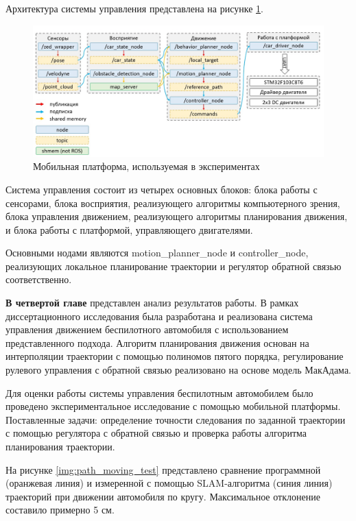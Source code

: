 Архитектура системы управления представлена на рисунке \ref{img:ros_arch}. 

\begin{figure}[h]
    \centering
    \includegraphics[width=\textwidth]{images/ros_arch}
    \caption{Мобильная платформа, используемая в экспериментах}
    \label{img:ros_arch}
\end{figure}

Система управления состоит из четырех основных блоков: блока работы с сенсорами, блока восприятия, 
реализующего алгоритмы компьютерного зрения, блока управления движением, реализующего алгоритмы
планирования движения, и блока работы с платформой, управляющего двигателями.

Основными нодами являются motion\_planner\_node и controller\_node, реализующих локальное планирование
траектории и регулятор обратной связью соответственно.

\textbf{В четвертой главе} представлен анализ результатов работы. В рамках диссертационного исследования
была разработана и реализована система управления движением беспилотного автомобиля с использованием
представленного подхода. Алгоритм планирования движения основан на интерполяции траектории с помощью
полиномов пятого порядка, регулирование рулевого управления с обратной связью реализовано на основе
модель МакАдама.

Для оценки работы системы управления беспилотным автомобилем было проведено экспериментальное исследование
с помощью мобильной платформы. Поставленные задачи: определение точности следования по заданной траектории
с помощью регулятора с обратной связью и проверка работы алгоритма планирования траектории.

На рисунке \ref{img:path_moving_test} представлено сравнение программной (оранжевая линия) 
и измеренной с помощью SLAM-алгоритма (синия линия) траекторий при движении автомобиля по кругу.
Максимальное отклонение составило примерно 5 см.


